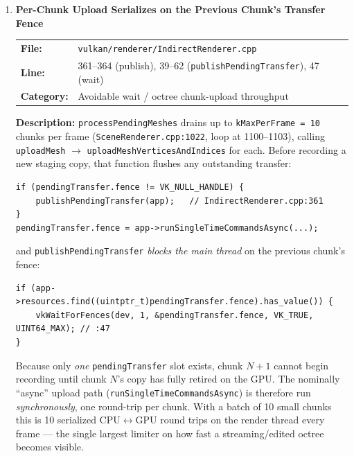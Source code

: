 \documentclass[a4paper,12pt]{article}
\newcommand{\severitybox}[2]{%
  \colorbox{#1}{\makebox[2.5cm][c]{\textcolor{white}{\textbf{#2}}}}%
}
\begin{document}
\begin{enumerate}[leftmargin=*]

\item[\textbf{[S1]}] \textbf{Per-Chunk Upload Serializes on the Previous Chunk's Transfer Fence}
  \hfill \severitybox{highcolor}{HIGH}

  \begin{tabular}{ll}
    \textbf{File:} & \texttt{vulkan/renderer/IndirectRenderer.cpp} \\
    \textbf{Line:} & 361--364 (publish), 39--62 (\texttt{publishPendingTransfer}), 47 (wait) \\
    \textbf{Category:} & Avoidable wait / octree chunk-upload throughput \\
  \end{tabular}

  \textbf{Description:}
  \texttt{processPendingMeshes} drains up to \texttt{kMaxPerFrame = 10} chunks
  per frame (\texttt{SceneRenderer.cpp:1022}, loop at 1100--1103), calling
  \texttt{uploadMesh} $\rightarrow$ \texttt{uploadMeshVerticesAndIndices} for
  each. Before recording a new staging copy, that function flushes any
  outstanding transfer:

\begin{lstlisting}
if (pendingTransfer.fence != VK_NULL_HANDLE) {
    publishPendingTransfer(app);   // IndirectRenderer.cpp:361
}
pendingTransfer.fence = app->runSingleTimeCommandsAsync(...);
\end{lstlisting}

  and \texttt{publishPendingTransfer} \emph{blocks the main thread} on the
  previous chunk's fence:

\begin{lstlisting}
if (app->resources.find((uintptr_t)pendingTransfer.fence).has_value()) {
    vkWaitForFences(dev, 1, &pendingTransfer.fence, VK_TRUE, UINT64_MAX); // :47
}
\end{lstlisting}

  Because only \emph{one} \texttt{pendingTransfer} slot exists, chunk $N+1$
  cannot begin recording until chunk $N$'s copy has fully retired on the GPU.
  The nominally ``async'' upload path (\texttt{runSingleTimeCommandsAsync}) is
  therefore run \emph{synchronously}, one round-trip per chunk. With a batch of
  10 small chunks this is 10 serialized CPU$\leftrightarrow$GPU round trips on
  the render thread every frame — the single largest limiter on how fast a
  streaming/edited octree becomes visible.


\end{enumerate}
\end{document}
